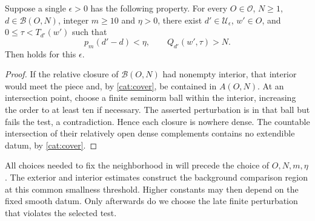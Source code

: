 \begin{proposition}\label{cat:destruction}
Suppose a single \(\epsilon>0\) has the following property. For every
\(O\in\mathscr O\), \(N\geq1\), \(d\in\mathcal B(O,N)\),
integer \(m\geq10\) and \(\eta>0\), there exist
\(d'\in\mathcal U_\epsilon\), \(w'\in O\), and
\(0\leq\tau<T_{d'}(w')\) such that
\[
 p_m(d'-d)<\eta,\qquad Q_{d'}(w',\tau)>N.
\]
Then  holds for this \(\epsilon\).
\end{proposition}
\begin{proof}
If the relative closure of \(\mathcal B(O,N)\) had nonempty interior,
that interior would meet the piece and, by \eqref{cat:cover}, be
contained in \(A(O,N)\). At an intersection point, choose a finite
seminorm ball within the interior, increasing the order to at least
ten if necessary. The asserted perturbation is in that ball but fails
the test, a contradiction. Hence each closure is nowhere dense. The
countable intersection of their relatively open dense complements
contains no extendible datum, by \eqref{cat:cover}.
\end{proof}

All choices needed to fix the neighborhood in
 will precede the choice of
\(O,N,m,\eta\). The exterior and interior estimates construct the
background comparison region at this common smallness threshold.
Higher constants may then depend on the fixed smooth datum. Only
afterwards do we choose the late finite perturbation that violates
the selected test.
